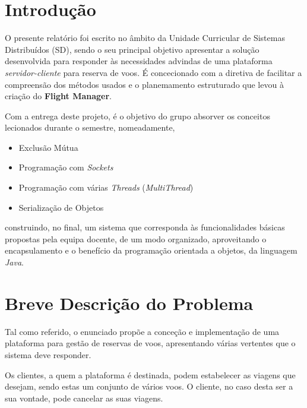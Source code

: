\documentclass[a4paper,11pt]{scrreprt}
\begin{document}


\chapter{Introdução}

O presente relatório foi escrito no âmbito da Unidade Curricular de Sistemas Distribuídos (SD), sendo o
seu principal objetivo apresentar a solução desenvolvida para responder às necessidades advindas de uma 
plataforma \textit{servidor-cliente} para reserva de voos.
É concecionado com a diretiva de facilitar a compreensão dos métodos usados e o planemamento
estruturado que levou à criação do \textbf{Flight Manager}.

Com a entrega deste projeto, é o objetivo do grupo absorver os conceitos lecionados durante o semestre,
nomeadamente,
\begin{itemize}
    \item Exclusão Mútua
    \item Programação com \textit{Sockets}
    \item Programação com várias \textit{Threads} (\textit{MultiThread})
    \item Serialização de Objetos
\end{itemize}

construindo, no final, um sistema que corresponda às funcionalidades básicas propostas pela equipa docente,
de um modo organizado, aproveitando o encapsulamento e o benefício da programação orientada a objetos, da 
linguagem \textit{Java}.


\chapter{Breve Descrição do Problema}

Tal como referido, o enunciado propõe a conceção e implementação de uma plataforma para gestão de reservas 
de voos, apresentando várias vertentes que o sistema deve responder.

Os clientes, a quem a plataforma é destinada, podem estabelecer as viagens que desejam, sendo estas um 
conjunto de vários voos. O cliente, no caso desta ser a sua vontade, pode cancelar as suas viagens.
\end{document}
